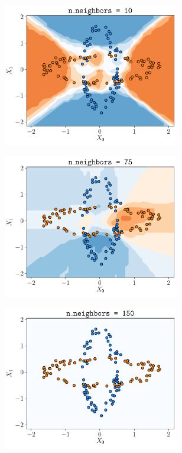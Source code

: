 \documentclass[a4paper, 12pt]{article}
\begin{document}
\begin{enumerate}[label = (\alph*)]
\begin{figure}[h]
\begin{subfigure}{0.49\textwidth}
        	    \includegraphics[width=0.85\textwidth]{resources/pdf/make_data1_neighbors10.pdf}
            \end{subfigure}
            \begin{subfigure}{0.49\textwidth}
                \centering
        	    \includegraphics[width=0.85\textwidth]{resources/pdf/make_data1_neighbors75.pdf}
            \end{subfigure}
            \begin{subfigure}{0.49\textwidth}
                \centering
        	    \includegraphics[width=0.85\textwidth]{resources/pdf/make_data1_neighbors150.pdf}

\end{subfigure}
\end{figure}
\end{enumerate}
\end{document}
